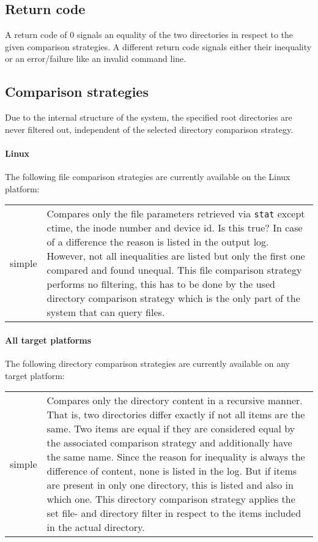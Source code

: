 \documentclass[a4paper]{article}
\newenvironment{note}{\color{magenta}}{\normalcolor}
\begin{document}
	\subsection{Return code}
	\label{subsec:return_code}
	
	A return code of 0 signals an equality of the two directories in respect to the given comparison strategies. A different return code signals either their inequality or an error/failure like an invalid command line.
	
	\subsection{Comparison strategies}
	\label{subsec:comparison_strategies}
	
	Due to the internal structure of the system, the specified root directories are never filtered out, independent of the selected directory comparison strategy.
	
	\paragraph{Linux} The following file comparison strategies are currently available on the Linux platform:
	
	\noindent
	\begin{tabularx}{\linewidth}{lX}
		simple & Compares only the file parameters retrieved via \texttt{stat} except ctime, the inode number and device id. \begin{note} Is this true? \end{note} In case of a difference the reason is listed in the output log. However, not all inequalities are listed but only the first one compared and found unequal. This file comparison strategy performs no filtering, this has to be done by the used directory comparison strategy which is the only part of the system that can query files.
	\end{tabularx}
	
	\paragraph{All target platforms} The following directory comparison strategies are currently available on any target platform:
	
	\noindent
	\begin{tabularx}{\linewidth}{lX}
		simple & Compares only the directory content in a recursive manner. That is, two directories differ exactly if not all items are the same. Two items are equal if they are considered equal by the associated comparison strategy and additionally have the same name. Since the reason for inequality is always the difference of content, none is listed in the log. But if items are present in only one directory, this is listed and also in which one. This directory comparison strategy applies the set file- and directory filter in respect to the items included in the actual directory.
	\end{tabularx}
	
\end{document}
